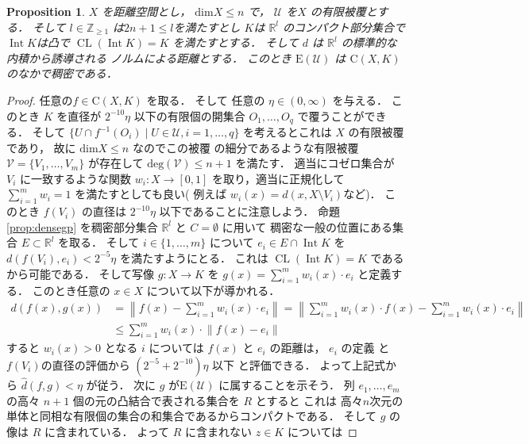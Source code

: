 \documentclass[leqno, a4paper, 12pt]{jsarticle}
\theoremstyle{plain}
\newtheorem{prop}[thm]{Proposition}
\theoremstyle{definition}
\theoremstyle{remark}
\newcommand{\zz}{\mathbb{Z}}
\newcommand{\rr}{\mathbb{R}}
\DeclareMathOperator{\cl}{\mathrm{CL}}
\DeclareMathOperator{\nai}{\mathrm{Int}}
\newcommand{\yodim}{\mathrm{dim}}
\newcommand{\yodeg}{\mathrm{deg}}
\newcommand{\yocovf}[1]{\mathscr{#1}}
\newcommand{\yosupmet}[1]{\widehat{#1}}
\newcommand{\yofuncsp}[2]{\mathrm{C}(#1, #2)}
\newcommand{\yofsusm}[1]{\mathrm{E}(#1)}
\numberwithin{equation}{section}
\begin{document}
\begin{prop}\label{prop:smalldense}
$X$
を距離空間とし，
$\yodim X\le n$
で，
$\yocovf{U}$
を$X$
の有限被覆とする．
そして
$l\in \zz_{\ge 1}$
は$2n+1\le l$を満たすとし
$K$は
$\rr^{l}$
のコンパクト部分集合で
$\nai K$は凸で
$\cl (\nai K)=K$
を満たすとする．
そして
$d$
は
$\rr^{l}$
の標準的な内積から誘導される
ノルムによる距離とする．
このとき
$\yofsusm{\yocovf{U}}$
は
$\yofuncsp{X}{K}$
のなかで稠密である．
\end{prop}
\begin{proof}
任意の$f\in \yofuncsp{X}{K}$
を取る．
そして
任意の
$\eta\in (0, \infty)$
を与える．
このとき
$K$
を直径が
$2^{-10}\eta$
以下の有限個の開集合
$O_{1}, \dots, O_{q}$
で覆うことができる．
そして
$\{U\cap f^{-1}(O_{i})\mid U\in \yocovf{U}, i=1, \dots, q\}$
を考えるとこれは
$X$
の有限被覆であり，
故に
$\yodim X\le n$
なのでこの被覆
の細分であるような有限被覆
$\yocovf{V}=\{V_{1}, \dots, V_{m}\}$
が存在して
$\yodeg(\yocovf{V})\le n+1$
を満たす．
適当にコゼロ集合が
$V_{i}$
に一致するような関数
$w_{i}\colon X\to [0, 1]$
を取り，適当に正規化して
$\sum_{i=1}^{m}w_{i}=1$
を満たすとしても良い(
例えば
$w_{i}(x)=d(x, X\setminus V_{i})$など)．
このとき
$f(V_{i})$
の直径は
$2^{-10}\eta$
以下であることに注意しよう．
命題
\ref{prop:densegp}
を稠密部分集合
$\rr^{l}$
と
$C=\emptyset$
に用いて
稠密な一般の位置にある集合
$E\subset \rr^{l}$
を取る．
そして
$i\in \{1, \dots, m\}$
について
$e_{i}\in E\cap \nai K$
を
$d(f(V_{i}), e_{i})<2^{-5}\eta$
を満たすようにとる．
これは
$\cl(\nai K)=K$
であるから可能である．
そして写像
$g\colon X\to K$
を
$g(x)=\sum_{i=1}^{m}w_{i}(x)\cdot e_{i}$
と定義する．
このとき任意の
$x\in X$
について以下が導かれる．
\begin{align*}
d(f(x), g(x))&=\left\lVert f(x)-  \sum_{i=1}^{m}w_{i}(x)\cdot e_{i}\right\rVert
=
\left\lVert \sum_{i=1}^{m}w_{i}(x)\cdot f(x)-  \sum_{i=1}^{m}w_{i}(x)\cdot e_{i}\right\rVert\\
&\le 
 \sum_{i=1}^{m}w_{i}(x)\cdot \left\lVert f(x)-  e_{i}\right\rVert
\end{align*}
すると
$w_{i}(x)>0$
となる
$i$
については
$f(x)$
と
$e_{i}$
の距離は，
$e_{i}$
の定義
と
$f(V_{i})$の直径の評価から
$(2^{-5}+2^{-10})\eta$
以下
と評価できる．
よって上記式から
$\yosupmet{d}(f, g)<\eta$
が従う．
次に
$g$
が$\yofsusm{\yocovf{U}}$
に属することを示そう．
列
$e_{1}, \dots, e_{m}$
の高々
$n+1$
個の元の凸結合で表される集合を
$R$
とすると
これは
高々$n$次元の
単体と同相な有限個の集合の和集合であるからコンパクトである．
そして
$g$
の像は
$R$
に含まれている．
よって
$R$
に含まれない
$z\in K$
については

\end{proof}
\end{document}
